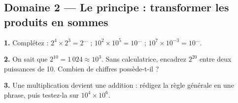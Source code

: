 \documentclass[11pt,a4paper]{article}
\begin{document}
\subsection*{Domaine 2 --- Le principe : transformer les produits en sommes}
\textbf{1.} Complétez : $2^{4} \times 2^{3} = 2^{\ldots}$ ; $10^{2} \times 10^{5} = 10^{\ldots}$ ; $10^{7} \times 10^{-3} = 10^{\ldots}$.
\par\smallskip
\noindent\makebox[\linewidth]{\dotfill}\par\vspace{1em}
\noindent\makebox[\linewidth]{\dotfill}\par\vspace{1em}
\noindent\makebox[\linewidth]{\dotfill}\par\vspace{1em}
\par\medskip
\textbf{2.} On sait que $2^{10} = 1\,024 \approx 10^{3}$. Sans calculatrice, encadrez $2^{20}$ entre deux puissances de 10. Combien de chiffres possède-t-il ?
\par\smallskip
\noindent\makebox[\linewidth]{\dotfill}\par\vspace{1em}
\noindent\makebox[\linewidth]{\dotfill}\par\vspace{1em}
\noindent\makebox[\linewidth]{\dotfill}\par\vspace{1em}
\par\medskip
\textbf{3.} Une multiplication devient une addition : rédigez la règle générale en une phrase, puis testez-la sur $10^{4} \times 10^{6}$.
\par\smallskip
\noindent\makebox[\linewidth]{\dotfill}\par\vspace{1em}
\noindent\makebox[\linewidth]{\dotfill}\par\vspace{1em}
\noindent\makebox[\linewidth]{\dotfill}\par\vspace{1em}
\par\medskip
\end{document}

